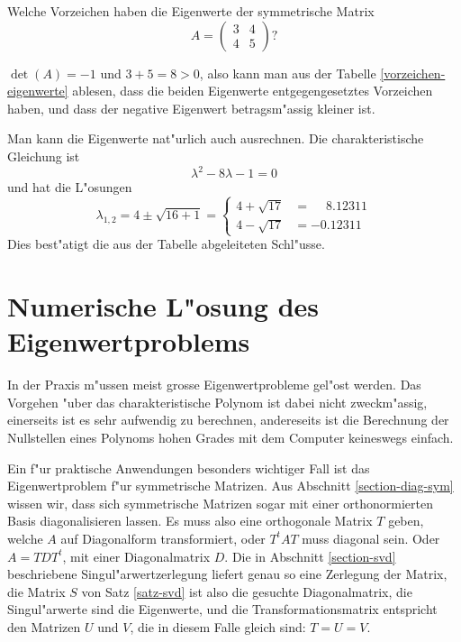 \begin{beispiel}[Zahlenbeispiel]
Welche Vorzeichen haben die Eigenwerte der symmetrische Matrix
\[
A=\begin{pmatrix}
3&4\\
4&5
\end{pmatrix}?
\]

\smallskip
{\parindent 0pt $\det(A)=-1$ und $3+5=8>0$, also kann man aus der
Tabelle \ref{vorzeichen-eigenwerte}
ablesen, dass die beiden Eigenwerte entgegengesetztes
Vorzeichen haben, und dass der negative Eigenwert betragsm"assig
kleiner ist.}

Man kann die Eigenwerte nat"urlich auch ausrechnen. Die charakteristische
Gleichung ist 
\[
\lambda^2-8\lambda-1=0
\]
und hat die L"osungen
\[
\lambda_{1,2}=4\pm\sqrt{16+1}=\begin{cases}
4+\sqrt{17}&=\phantom{-}8.12311\\
4-\sqrt{17}&=-0.12311
\end{cases}
\]
Dies best"atigt die aus der Tabelle abgeleiteten Schl"usse.
\end{beispiel}

\section{Numerische L"osung des Eigenwertproblems}
In der Praxis m"ussen meist grosse Eigenwertprobleme gel"ost werden.
Das Vorgehen "uber das charakteristische Polynom ist dabei nicht zweckm"assig,
einerseits ist es sehr aufwendig zu berechnen, andereseits ist die
Berechnung der Nullstellen eines Polynoms hohen Grades mit dem Computer
keineswegs einfach.

Ein f"ur praktische Anwendungen besonders wichtiger Fall ist
das Eigenwertproblem f"ur symmetrische Matrizen.
Aus Abschnitt \ref{section-diag-sym} wissen wir, dass sich symmetrische
Matrizen sogar mit einer orthonormierten Basis diagonalisieren lassen.
Es muss also eine orthogonale Matrix $T$ geben, welche $A$ auf
Diagonalform transformiert, oder $T^tAT$ muss diagonal sein.
Oder $A=TDT^t$, mit einer Diagonalmatrix $D$.
Die in Abschnitt \ref{section-svd} beschriebene Singul"arwertzerlegung
liefert genau so eine Zerlegung der Matrix, die Matrix $S$ von 
Satz \ref{satz-svd} ist also die gesuchte Diagonalmatrix, die
Singul"arwerte sind die Eigenwerte, und die Transformationsmatrix
entspricht den Matrizen $U$ und $V$, die in diesem Falle gleich sind:
$T=U=V$. 

